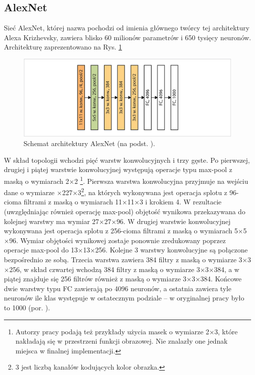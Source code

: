 \subsection{AlexNet}
\label{AlexNet}
Sieć AlexNet, której nazwa pochodzi od imienia głównego twórcy tej architektury Alexa Krizhevsky, zawiera blisko 60 milionów parametrów i 650 tysięcy neuronów. Architekturę zaprezentowano na Rys. \ref{AlexNetTopology}
\begin{figure}[h!]
	\centering
	\includegraphics[width=1\textwidth]{figures/AlexNet.png}
	\caption{Schemat architektury AlexNet (na podst. \cite{Krizhevsky2012}).}
	\label{AlexNetTopology}
\end{figure}

W skład topologii wchodzi pięć warstw konwolucyjnych i trzy gęste. Po pierwszej, drugiej i piątej warstwie konwolucyjnej występują operacje typu max-pool z maską o wymiarach 2$\times$2 \footnote{Autorzy pracy podają też przykłady użycia masek o wymiarze 2$\times$3, które nakładają się \linebreak w przestrzeni funkcji obrazowej. Nie znalazły one jednak miejsca w finalnej implementacji.}. 
\newpage
Pierwsza warstwa konwolucyjna przyjmuje na wejściu dane o wymiarze $\times$227$\times$3\footnote{3 jest liczbą kanałów kodujących kolor obrazka.}, na których wykonywana jest operacja splotu z 96-cioma filtrami \linebreak z maską o wymiarach 11$\times$11$\times$3 i krokiem 4. W rezultacie (uwzględniając również operację max-pool) objętość wynikowa przekazywana do kolejnej warstwy ma wymiar 27$\times$27$\times$96. W drugiej warstwie konwolucyjnej wykonywana jest operacja splotu z 256-cioma filtrami z maską o wymiarach 5$\times$5$\times$96. Wymiar objętości wynikowej zostaje ponownie zredukowany poprzez operacje max-pool do 13$\times$13$\times$256. Kolejne 3 warstwy konwolucyjne są połączone bezpośrednio ze sobą. Trzecia warstwa zawiera 384 filtry z maską o wymiarze 3$\times$3$\times$256, w skład czwartej wchodzą 384 filtry \linebreak z maską o wymiarze 3$\times$3$\times$384, a w piątej znajduje się 256 filtrów również z maską \linebreak o wymiarze 3$\times$3$\times$384. Końcowe dwie warstwy typu FC zawierają po 4096 neuronów, a ostatnia zawiera tyle neuronów ile klas występuje w ostatecznym podziale -- w oryginalnej pracy było to 1000 (por. \cite{Krizhevsky2012}).

